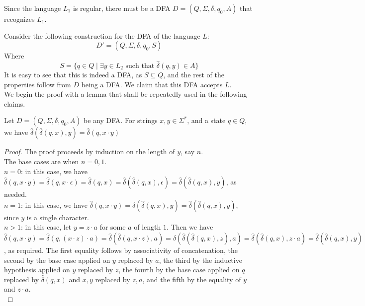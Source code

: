 \begin{soln}

    Since the language $L_1$ is regular, there must be a DFA $D = (Q, \Sigma, \delta, q_0, A)$ that recognizes $L_1$.

    Consider the following construction for the DFA of the language $L$:
    $$
    D' = (Q, \Sigma, \delta, q_0, S)
    $$
    Where 
    $$
    S = \{q \in Q \mid \exists y \in L_2 \text{ such that } \hat{\delta}(q, y) \in A\}
    $$
    It is easy to see that this is indeed a DFA, as $S \subseteq Q$, and the rest of the properties follow from $D$ being a DFA.
    We claim that this DFA accepts $L$.\\


        We begin the proof with a lemma that shall be repeatedly used in the following claims.\\

        \begin{lemma}
            Let $D = (Q, \Sigma, \delta, q_0, A)$ be any DFA. For strings $x, y \in \Sigma^*$, and a state $q \in Q$, we have $\hat{\delta}(\hat{\delta}(q, x), y) = \hat{\delta}(q, x \cdot y)$
        \end{lemma}

        \begin{proof}
            The proof proceeds by induction on the length of $y$, say $n$.\\
            The base cases are when $n = 0, 1$.\\

            $n = 0$: in this case, we have $\hat{\delta}(q, x \cdot y) = \hat{\delta}(q, x \cdot \epsilon) = \hat{\delta}(q, x) = \hat{\delta}(\hat{\delta}(q, x), \epsilon) =
            \hat{\delta}(\hat{\delta}(q, x), y)$, as needed.\\
            $n = 1$: in this case, we have $\hat{\delta}(q, x \cdot y) = \delta(\hat{\delta}(q, x), y) = \hat{\delta}(\hat{\delta}(q, x), y)$, since $y$ is a single character.\\

            $n > 1$: in this case, let $y = z \cdot a$ for some $a$ of length $1$. Then we have $\hat{\delta}(q, x \cdot y) = \hat{\delta}(q, (x \cdot z) \cdot a) = \hat{\delta}(\hat{\delta}(q, x
            \cdot z), a) = \hat{\delta}(\hat{\delta}(\hat{\delta}(q, x), z), a) = \hat{\delta}(\hat{\delta}(q, x), z \cdot a) = \hat{\delta}(\hat{\delta}(q, x), y)$, as required. The first equality
            follows by associativity of concatenation, the second by the base case applied on $y$ replaced by $a$, the third by the inductive hypothesis applied on $y$ replaced by $z$, the fourth by the base
            case applied on $q$ replaced by $\hat{\delta}(q, x)$ and $x, y$ replaced by $z, a$, and the fifth by the equality of $y$ and $z \cdot a$.\\


\end{proof}
\end{soln}
